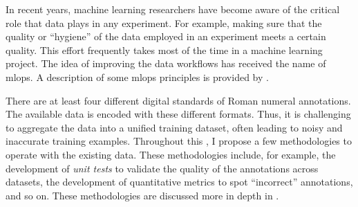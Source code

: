 

In recent years, machine learning researchers have become
aware of the critical role that data plays in any
experiment. For example, making sure that the quality or
``hygiene'' of the data employed in an experiment meets a
certain quality. This effort frequently takes most of the
time in a machine learning project. The idea of improving
the data workflows has received the name of \gls{mlops}. A
description of some \gls{mlops} principles is provided by
\textcite{renggli2021data}.

There are at least four different digital standards of Roman
numeral annotations. The available data is encoded with
these different formats. Thus, it is challenging to
aggregate the data into a unified training dataset, often
leading to noisy and inaccurate training examples.
Throughout this \thesisdiss{}, I propose a few methodologies
to operate with the existing data. These methodologies
include, for example, the development of \emph{unit tests}
to validate the quality of the annotations across datasets,
the development of quantitative metrics to spot
``incorrect'' annotations, and so on. These methodologies
are discussed more in depth in
.
